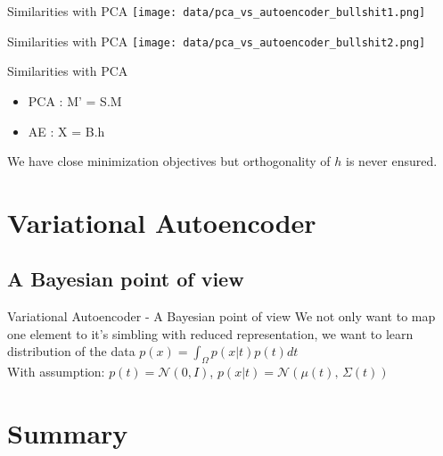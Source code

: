\documentclass{beamer}
\begin{document}
\begin{frame}{Similarities with PCA}
    \texttt{[image: data/pca\_vs\_autoencoder\_bullshit1.png]}
\end{frame}

\begin{frame}{Similarities with PCA}
    \texttt{[image: data/pca\_vs\_autoencoder\_bullshit2.png]}
\end{frame}

\begin{frame}{Similarities with PCA}
	\begin{itemize}
		\item PCA : M' = S.M  
		\item AE : X = B.h
	\end{itemize}
We have close minimization objectives but orthogonality of $h$ is never ensured.
%
\end{frame}

\section{Variational Autoencoder}
\subsection{A Bayesian point of view}
\begin{frame}{Variational Autoencoder - A Bayesian point of view}
	We not only want to map one element to it's simbling with reduced representation, we want to learn distribution of the data
	$ p(x) = \int_\Omega p(x|t)p(t) dt$  \\
	With assumption: $p(t) = \mathcal{N}(0, I)$, 
	$ p(x| t) = \mathcal{N}(\mu(t),\,\Sigma(t))$ 
	
\end{frame}

\section*{Summary}
\end{document}
